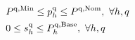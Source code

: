 \documentclass[conference]{IEEEtran}
\begin{document}
{\begin{subequations}
\begin{align}
        \  & P^{\rm{q},\rm{Min}} \leq p_{h}^{\rm{q}} \leq P^{\rm{q},\rm{Nom}}, \                                                                                                                                           \forall{h,q}                                                                             \label{power:11q}                                                                                                                                                                                                                                         \\
        \  & 0 \leq s_{h}^{\rm{q}} \leq P^{\rm{q},\rm{Base}}_{h}, \                                                                                                                                                   \forall{h,q}                                                                             \label{power:12q}                                                                                                                                                                                                                                       \\

\end{align}
\end{subequations}}
\end{document}
